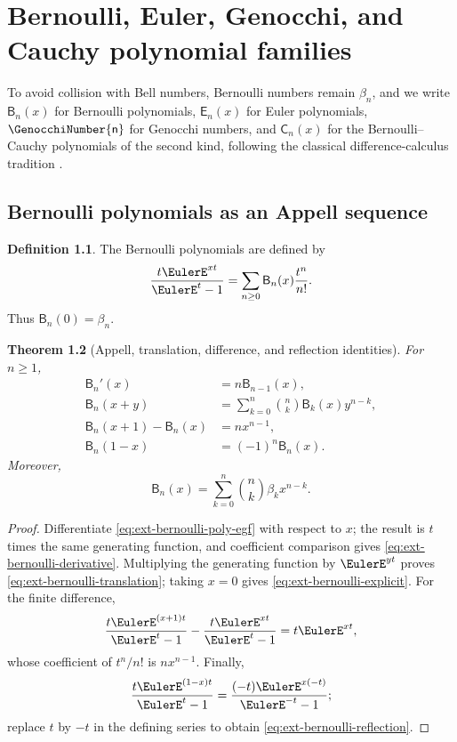 \documentclass[11pt,a4paper,oneside,openany]{book}
\newtheorem{theorem}{Theorem}[chapter]
\theoremstyle{definition}
\newtheorem{definition}[theorem]{Definition}
\theoremstyle{remark}
\begin{document}
\chapter{Bernoulli, Euler, Genocchi, and Cauchy polynomial families}
\label{ch:ext-bernoulli}

To avoid collision with Bell numbers, Bernoulli numbers remain \(\beta_n\), and
we write \(\mathsf B_n(x)\) for Bernoulli polynomials, \(\mathsf E_n(x)\) for
Euler polynomials, \(\mathsf \GenocchiNumber{n}\) for Genocchi numbers, and
\(\mathsf C_n(x)\) for the Bernoulli--Cauchy polynomials of the second kind, following the classical difference-calculus tradition \cite{Norlund1924}.

\section{Bernoulli polynomials as an Appell sequence}

\begin{definition}
The Bernoulli polynomials are defined by
\begin{equation}\label{eq:ext-bernoulli-poly-egf}
 \frac{t \EulerE^{xt}}{\EulerE^t-1}
 =\sum_{n\ge0}\mathsf B_n(x)\frac{t^n}{n!}.
\end{equation}
Thus \(\mathsf B_n(0)=\beta_n\).
\end{definition}

\begin{theorem}[Appell, translation, difference, and reflection identities]
For \(n\ge1\),
\begin{align}
 \mathsf B_n'(x)&=n\mathsf B_{n-1}(x),\label{eq:ext-bernoulli-derivative}\\
 \mathsf B_n(x+y)&=\sum_{k=0}^n\binom nk\mathsf B_k(x)y^{n-k},\label{eq:ext-bernoulli-translation}\\
 \mathsf B_n(x+1)-\mathsf B_n(x)&=nx^{n-1},\label{eq:ext-bernoulli-difference}\\
 \mathsf B_n(1-x)&=(-1)^n\mathsf B_n(x).\label{eq:ext-bernoulli-reflection}
\end{align}
Moreover,
\begin{equation}\label{eq:ext-bernoulli-explicit}
 \mathsf B_n(x)=\sum_{k=0}^n\binom nk\beta_k x^{n-k}.
\end{equation}
\end{theorem}
\begin{proof}
Differentiate \eqref{eq:ext-bernoulli-poly-egf} with respect to \(x\); the
result is \(t\) times the same generating function, and coefficient comparison
gives \eqref{eq:ext-bernoulli-derivative}.  Multiplying the generating function
by \(\EulerE^{yt}\) proves \eqref{eq:ext-bernoulli-translation}; taking \(x=0\)
gives \eqref{eq:ext-bernoulli-explicit}.  For the finite difference,
\[
 \frac{t \EulerE^{(x+1)t}}{\EulerE^t-1}-\frac{t \EulerE^{xt}}{\EulerE^t-1}=t \EulerE^{xt},
\]
whose coefficient of \(t^n/n!\) is \(nx^{n-1}\).  Finally,
\[
 \frac{t \EulerE^{(1-x)t}}{\EulerE^t-1}
 =\frac{(-t)\EulerE^{x(-t)}}{\EulerE^{-t}-1};
\]
replace \(t\) by \(-t\) in the defining series to obtain
\eqref{eq:ext-bernoulli-reflection}.
\end{proof}
\end{document}
